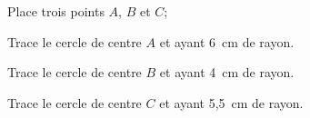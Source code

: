 \par
\begin{myenumerate}
\item Place trois points $A$, $B$ et $C$;
\item Trace le cercle de centre $A$ et ayant 6~cm de rayon.
\item Trace le cercle de centre $B$ et ayant 4~cm de rayon.
\item Trace le cercle de centre $C$ et ayant 5,5~cm de rayon.
\end{myenumerate}
